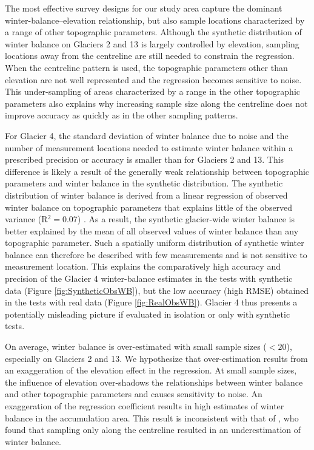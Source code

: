 \documentclass[twocolumn,letterpaper]{igs}
\begin{document}
The most effective survey designs for our study area capture the dominant winter-balance--elevation relationship, but also sample locations characterized by a range of other topographic parameters. Although the synthetic distribution of winter balance on Glaciers 2 and 13 is largely controlled by elevation, sampling locations away from the centreline are still needed to constrain the regression. When the centreline pattern is used, the topographic parameters other than elevation are not well represented and the regression becomes sensitive to noise. This under-sampling of areas characterized by a range in the other topographic parameters also explains why increasing sample size along the centreline  does not improve accuracy as quickly as in the other sampling patterns.

For Glacier 4, the standard deviation of winter balance due to noise and the number of measurement locations needed to estimate winter balance within a prescribed precision or accuracy is smaller than for Glaciers 2 and 13. This difference is likely a result of the generally weak relationship between topographic parameters and winter balance in the synthetic distribution. The synthetic distribution of winter balance is derived from a linear regression of observed winter balance on topographic parameters that explains little of the observed variance (R$^2=$0.07) \citep{Pulwicki2017}. As a result, the synthetic glacier-wide winter balance is better explained by the mean of all observed values of winter balance than any topographic parameter. Such a spatially uniform distribution of synthetic winter balance can therefore be described with few measurements and is not sensitive to measurement location. This explains the comparatively high accuracy and precision of the Glacier 4 winter-balance estimates in the tests with synthetic data (Figure \ref{fig:SyntheticObsWB}), but the low accuracy (high RMSE) obtained in the tests with real data (Figure \ref{fig:RealObsWB}). Glacier 4 thus presents a potentially misleading picture if evaluated in isolation or only with synthetic tests.   

On average, winter balance is over-estimated with small sample sizes ($<20$), especially on Glaciers 2 and 13. We hypothesize that over-estimation results from an exaggeration of the elevation effect in the regression.
At small sample sizes, the influence of elevation over-shadows the relationships between winter balance and other topographic parameters and causes sensitivity to noise. An exaggeration of the regression coefficient results in high estimates of winter balance in the accumulation area. This result is inconsistent with that of \cite{Walmsley2015}, who found that sampling only along the centreline resulted in an underestimation of winter balance.
\end{document}
